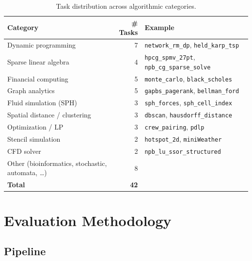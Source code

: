 \documentclass{article}
\begin{document}
\begin{table}[ht]
\centering
\small
\caption{Task distribution across algorithmic categories.}
\label{tab:categories}
\begin{tabular}{@{}lrl@{}}
\toprule
\textbf{Category} & \textbf{\# Tasks} & \textbf{Example} \\
\midrule
Dynamic programming          & 7 & \texttt{network\_rm\_dp}, \texttt{held\_karp\_tsp} \\
Sparse linear algebra        & 4 & \texttt{hpcg\_spmv\_27pt}, \texttt{npb\_cg\_sparse\_solve} \\
Financial computing          & 5 & \texttt{monte\_carlo}, \texttt{black\_scholes} \\
Graph analytics              & 5 & \texttt{gapbs\_pagerank}, \texttt{bellman\_ford} \\
Fluid simulation (SPH)       & 3 & \texttt{sph\_forces}, \texttt{sph\_cell\_index} \\
Spatial distance / clustering& 3 & \texttt{dbscan}, \texttt{hausdorff\_distance} \\
Optimization / LP            & 3 & \texttt{crew\_pairing}, \texttt{pdlp} \\
Stencil simulation           & 2 & \texttt{hotspot\_2d}, \texttt{miniWeather} \\
CFD solver                   & 2 & \texttt{npb\_lu\_ssor\_structured} \\
Other (bioinformatics, stochastic, automata, \ldots) & 8 & \\
\midrule
\textbf{Total}               & \textbf{42} & \\
\bottomrule
\end{tabular}
\end{table}

\section{Evaluation Methodology}
\label{sec:eval}

\subsection{Pipeline}
\end{document}

